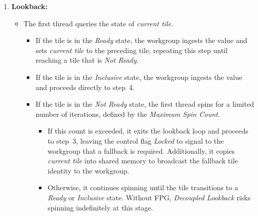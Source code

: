 \documentclass[acmsmall, manuscript, screen, review, anonymous]{acmart}
\begin{document}
\begin{enumerate}
  \item \textbf{Lookback:}
        \begin{itemize}
          \item The first thread queries the state of \emph{current tile}.
                \begin{itemize}
                  \item If the tile is in the \emph{Ready} state, the workgroup ingests the value and sets \emph{current tile} to the preceding tile, repeating this step until reaching a tile that is \emph{Not Ready}.
                  \item If the tile is in the \emph{Inclusive} state, the workgroup ingests the value and proceeds directly to step~4.
                  \item If the tile is in the \emph{Not Ready} state, the first thread spins for a limited number of iterations, defined by the \emph{Maximum Spin Count}.
                        \begin{itemize}
                          \item If this count is exceeded, it exits the lookback loop and proceeds to step~3, leaving the control flag \emph{Locked} to signal to the workgroup that a fallback is required. Additionally, it copies \emph{current tile} into shared memory to broadcast the fallback tile identity to the workgroup.
                          \item Otherwise, it continues spinning until the tile transitions to a \emph{Ready} or \emph{Inclusive} state. Without FPG, \emph{Decoupled Lookback} risks spinning indefinitely at this stage.
                        \end{itemize}
                \end{itemize}
        \end{itemize}


\end{enumerate}
\end{document}

